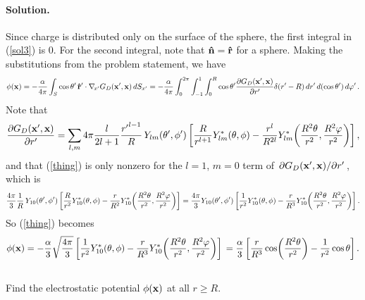 \documentclass[11pt]{article}
\newcommand{\vfix}{\vspace{-\baselineskip}}
\newcommand{\refeq}[1]{(\ref{#1})}
\newcommand{\beq}{\begin{equation*}}
\newcommand{\eeq}{\end{equation*}}
\newcommand{\beqn}{\begin{equation}}
\newcommand{\eeqn}{\end{equation}}
\newenvironment{problem}
{
	\subsection{}
	\color{darkgray}
    \ignorespaces
}
{

}
\newenvironment{solution}
{
    \paragraph{Solution.}
    \ignorespaces
}
{
    \bigskip
}
\begin{document}
\begin{solution}
	Since charge is distributed only on the surface of the sphere, the first integral in \refeq{sol3} is 0.  For the second integral, note that $\mathbf{\hat{n}} = \mathbf{\hat{r}}$ for a sphere.  Making the substitutions from the problem statement, we have
	\beqn \label{thing}
		\phix = -\frac{\alp}{4\pi} \intS \costp \, \rh' \cdot \nabxp \Gdxpx \dSxp
		= -\frac{\alp}{4\pi} \intotp \intono \intoR \costp \pdv{\Gdxpx}{r'} \delta(r' - R) \drp \dctp \dvp.
	\eeqn
	Note that
	\begin{align*}
		\pdv{G_D(\mathbf{x}', \mathbf{x})}{r'} = \sum_{l,m} 4\pi \frac{l}{2l + 1} \frac{{r'}^{l-1}}{R} \, Y_{l m}(\theta', \phi') \left[ \frac{R}{r^{l + 1}} Y_{l m}^*(\theta, \phi) - \frac{r^l}{R^{2l}} Y_{l m}^*\!\left( \frac{R^2 \theta}{r^2}, \frac{R^2 \varphi}{r^2} \right) \right],
	\end{align*}
	and that \refeq{thing} is only nonzero for the $l = 1$, $m = 0$ term of $\pdv*{G_D(\mathbf{x}', \mathbf{x})}{r'}$, which is
	\beq
		\frac{4\pi}{3} \frac{1}{R} \, Y_{1 0}\tvp \left[ \frac{R}{r^2} Y_{1 0}^*\tv - \frac{r}{R^2} Y_{1 0}^*\!\left( \frac{R^2 \tht}{r^2}, \frac{R^2 \vph}{r^2} \right) \right]
		= \frac{4\pi}{3} Y_{1 0}\tvp \left[ \frac{1}{r^2} Y_{1 0}^*\tv - \frac{r}{R^3} Y_{1 0}^*\!\left( \frac{R^2 \tht}{r^2}, \frac{R^2 \vph}{r^2} \right) \right].
	\eeq
	So \refeq{thing} becomes
	\beq
		\phix = -\frac{\alp}{3} \sqfr{4\pi}{3} \left[ \frac{1}{r^2} Y_{1 0}^*\tv - \frac{r}{R^3} Y_{1 0}^*\!\left( \frac{R^2 \tht}{r^2}, \frac{R^2 \vph}{r^2} \right) \right] \\
		= \frac{\alp}{3} \left[ \frac{r}{R^3} \cos(\frac{R^2 \tht}{r^2}) - \frac{1}{r^2} \cost \right].
	\eeq
\end{solution}
\vfix


\begin{problem}
	Find the electrostatic potential $\phi(\mathbf{x})$ at all $r \geq R$.
\end{problem}
\end{document}
